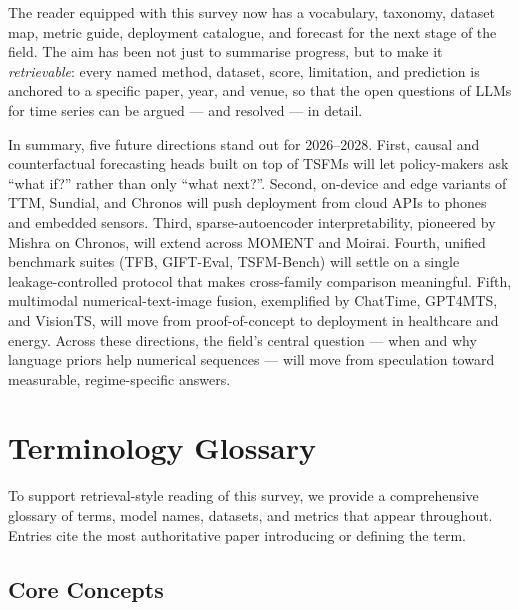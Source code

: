 \documentclass{article}
\begin{document}
The reader equipped with this survey now has a vocabulary, taxonomy, dataset map, metric guide, deployment catalogue, and forecast for the next stage of the field. The aim has been not just to summarise progress, but to make it \emph{retrievable}: every named method, dataset, score, limitation, and prediction is anchored to a specific paper, year, and venue, so that the open questions of LLMs for time series can be argued --- and resolved --- in detail.

In summary, five future directions stand out for 2026--2028. First, causal and counterfactual forecasting heads built on top of TSFMs will let policy-makers ask ``what if?'' rather than only ``what next?''. Second, on-device and edge variants of TTM, Sundial, and Chronos will push deployment from cloud APIs to phones and embedded sensors. Third, sparse-autoencoder interpretability, pioneered by Mishra \citet{mishra2026dissectingchronoss} on Chronos, will extend across MOMENT and Moirai. Fourth, unified benchmark suites (TFB, GIFT-Eval, TSFM-Bench) will settle on a single leakage-controlled protocol that makes cross-family comparison meaningful. Fifth, multimodal numerical-text-image fusion, exemplified by ChatTime, GPT4MTS, and VisionTS, will move from proof-of-concept to deployment in healthcare and energy. Across these directions, the field's central question --- when and why language priors help numerical sequences --- will move from speculation toward measurable, regime-specific answers.

\section{Terminology Glossary}\label{terminology-glossary}

To support retrieval-style reading of this survey, we provide a comprehensive glossary of terms, model names, datasets, and metrics that appear throughout. Entries cite the most authoritative paper introducing or defining the term.

\subsection{Core Concepts}\label{core-concepts}
\end{document}
